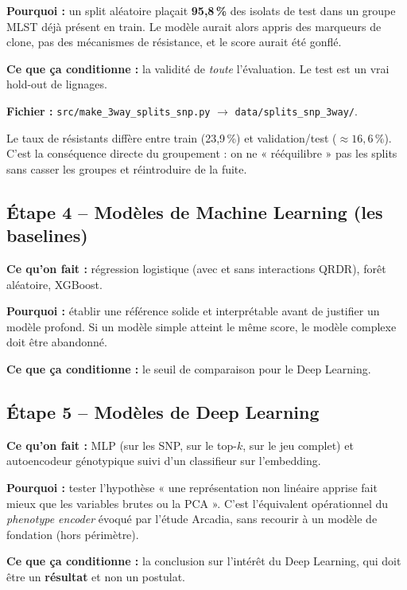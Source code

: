 \documentclass[11pt,a4paper]{article}
\begin{document}
\textbf{Pourquoi :} un split aléatoire plaçait \textbf{95,8\,\%} des isolats de test dans un groupe MLST déjà présent en train. Le modèle aurait alors appris des marqueurs de clone, pas des mécanismes de résistance, et le score aurait été gonflé.

\textbf{Ce que ça conditionne :} la validité de \emph{toute} l'évaluation. Le test est un vrai hold-out de lignages.

\textbf{Fichier :} \texttt{src/make\_3way\_splits\_snp.py} $\rightarrow$ \texttt{data/splits\_snp\_3way/}.

\begin{warnbox}
Le taux de résistants diffère entre train (23,9\,\%) et validation/test ($\approx 16,6\,\%$). C'est la conséquence directe du groupement : on ne « rééquilibre » pas les splits sans casser les groupes et réintroduire de la fuite.
\end{warnbox}

\subsection{Étape 4 -- Modèles de Machine Learning (les baselines)}
\textbf{Ce qu'on fait :} régression logistique (avec et sans interactions QRDR), forêt aléatoire, XGBoost.

\textbf{Pourquoi :} établir une référence solide et interprétable avant de justifier un modèle profond. Si un modèle simple atteint le même score, le modèle complexe doit être abandonné.

\textbf{Ce que ça conditionne :} le seuil de comparaison pour le Deep Learning.

\subsection{Étape 5 -- Modèles de Deep Learning}
\textbf{Ce qu'on fait :} MLP (sur les SNP, sur le top-$k$, sur le jeu complet) et autoencodeur génotypique suivi d'un classifieur sur l'embedding.

\textbf{Pourquoi :} tester l'hypothèse « une représentation non linéaire apprise fait mieux que les variables brutes ou la PCA ». C'est l'équivalent opérationnel du \emph{phenotype encoder} évoqué par l'étude Arcadia, sans recourir à un modèle de fondation (hors périmètre).

\textbf{Ce que ça conditionne :} la conclusion sur l'intérêt du Deep Learning, qui doit être un \textbf{résultat} et non un postulat.
\end{document}
